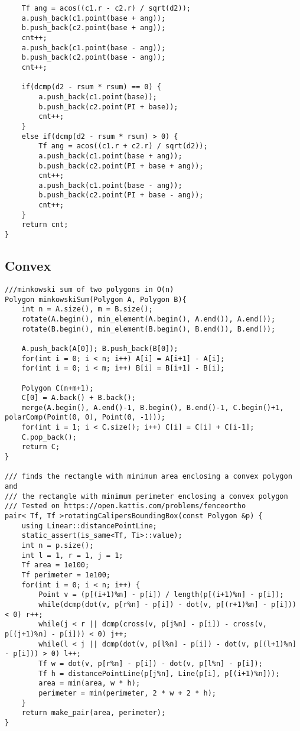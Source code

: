 \documentclass[FSZ,a4paper,onesided]{article}
\begin{document}
\begin{multicols*}{\COLS}
\begin{lstlisting}
    Tf ang = acos((c1.r - c2.r) / sqrt(d2));
    a.push_back(c1.point(base + ang));
    b.push_back(c2.point(base + ang));
    cnt++;
    a.push_back(c1.point(base - ang));
    b.push_back(c2.point(base - ang));
    cnt++;

    if(dcmp(d2 - rsum * rsum) == 0) {
        a.push_back(c1.point(base));
        b.push_back(c2.point(PI + base));
        cnt++;
    }
    else if(dcmp(d2 - rsum * rsum) > 0) {
        Tf ang = acos((c1.r + c2.r) / sqrt(d2));
        a.push_back(c1.point(base + ang));
        b.push_back(c2.point(PI + base + ang));
        cnt++;
        a.push_back(c1.point(base - ang));
        b.push_back(c2.point(PI + base - ang));
        cnt++;
    }
    return cnt;
}\end{lstlisting}
\subsection{Convex}
\begin{lstlisting}
///minkowski sum of two polygons in O(n)
Polygon minkowskiSum(Polygon A, Polygon B){
    int n = A.size(), m = B.size();
    rotate(A.begin(), min_element(A.begin(), A.end()), A.end());
    rotate(B.begin(), min_element(B.begin(), B.end()), B.end());

    A.push_back(A[0]); B.push_back(B[0]);
    for(int i = 0; i < n; i++) A[i] = A[i+1] - A[i];
    for(int i = 0; i < m; i++) B[i] = B[i+1] - B[i];

    Polygon C(n+m+1);
    C[0] = A.back() + B.back();
    merge(A.begin(), A.end()-1, B.begin(), B.end()-1, C.begin()+1, polarComp(Point(0, 0), Point(0, -1)));
    for(int i = 1; i < C.size(); i++) C[i] = C[i] + C[i-1];
    C.pop_back();
    return C;
}

/// finds the rectangle with minimum area enclosing a convex polygon and
/// the rectangle with minimum perimeter enclosing a convex polygon
/// Tested on https://open.kattis.com/problems/fenceortho
pair< Tf, Tf >rotatingCalipersBoundingBox(const Polygon &p) {
    using Linear::distancePointLine;
    static_assert(is_same<Tf, Ti>::value);
    int n = p.size();
    int l = 1, r = 1, j = 1;
    Tf area = 1e100;
    Tf perimeter = 1e100;
    for(int i = 0; i < n; i++) {
        Point v = (p[(i+1)%n] - p[i]) / length(p[(i+1)%n] - p[i]);
        while(dcmp(dot(v, p[r%n] - p[i]) - dot(v, p[(r+1)%n] - p[i])) < 0) r++;
        while(j < r || dcmp(cross(v, p[j%n] - p[i]) - cross(v, p[(j+1)%n] - p[i])) < 0) j++;
        while(l < j || dcmp(dot(v, p[l%n] - p[i]) - dot(v, p[(l+1)%n] - p[i])) > 0) l++;
        Tf w = dot(v, p[r%n] - p[i]) - dot(v, p[l%n] - p[i]);
        Tf h = distancePointLine(p[j%n], Line(p[i], p[(i+1)%n]));
        area = min(area, w * h);
        perimeter = min(perimeter, 2 * w + 2 * h);
    }
    return make_pair(area, perimeter);
}


\end{lstlisting}
\end{multicols*}
\end{document}
